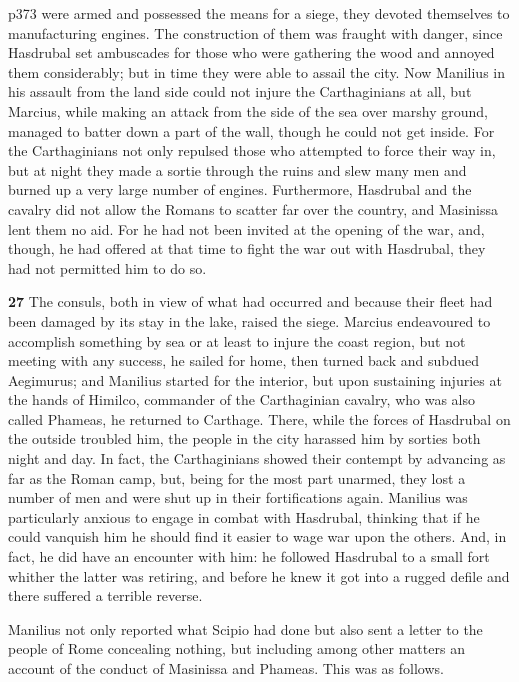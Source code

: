 p373 were armed and possessed the means for a siege, they devoted themselves to manufacturing engines. The construction of them was fraught with danger, since Hasdrubal set ambuscades for those who were gathering the wood and annoyed them considerably; but in time they were able to assail the city. Now Manilius in his assault from the land side could not injure the Carthaginians at all, but Marcius, while making an attack from the side of the sea over marshy ground, managed to batter down a part of the wall, though he could not get inside. For the Carthaginians not only repulsed those who attempted to force their way in, but at night they made a sortie through the ruins and slew many men and burned up a very large number of engines. Furthermore, Hasdrubal and the cavalry did not allow the Romans to scatter far over the country, and Masinissa lent them no aid. For he had not been invited at the opening of the war, and, though, he had offered at that time to fight the war out with Hasdrubal, they had not permitted him to do so.

\textbf{27}
The consuls, both in view of what had occurred and because their fleet had been damaged by its stay in the lake, raised the siege. Marcius endeavoured to accomplish something by sea or at least to injure the coast region, but not meeting with any success, he sailed for home, then turned back and subdued Aegimurus; and Manilius started for the interior, but upon sustaining injuries at the hands of Himilco, commander of the Carthaginian cavalry, who was also called Phameas, he returned to Carthage. There, while the forces of Hasdrubal on the outside troubled him, the people in the city harassed him by sorties both night and day. In fact, the Carthaginians showed their contempt by advancing as far as the Roman camp, but, being for the most part unarmed, they lost a number of men and were shut up in their fortifications again. Manilius was particularly anxious to engage in combat with Hasdrubal, thinking that if he could vanquish him he should find it easier to wage war upon the others. And, in fact, he did have an encounter with him: he followed Hasdrubal to a small fort whither the latter was retiring, and before he knew it got into a rugged defile and there suffered a terrible reverse.

Manilius not only reported what Scipio had done but also sent a letter to the people of Rome concealing nothing, but including among other matters an account of the conduct of Masinissa and Phameas. This was as follows.

